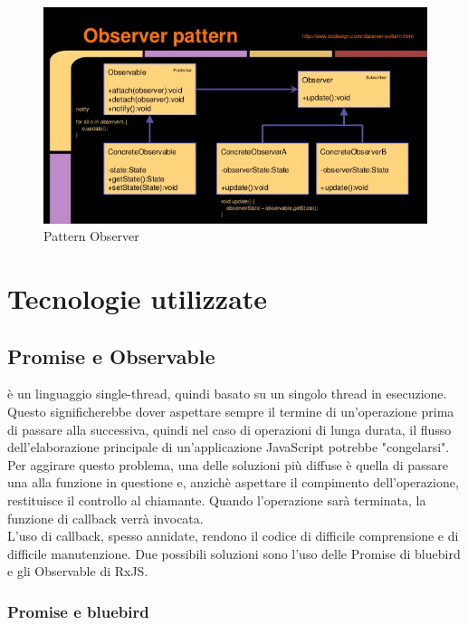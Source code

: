 	\begin{figure}[h]
		\centering
		\includegraphics[width=\textwidth,height=\textheight,keepaspectratio,scale=0.1]{images/observerpattern.png}
		\caption{Pattern Observer}\label{fig:obs1}
	\end{figure}
	\newpage
	\section{Tecnologie utilizzate}
	\subsection{Promise e Observable}


 è un linguaggio single-thread, quindi basato su un singolo thread in esecuzione. Questo significherebbe dover aspettare sempre il termine di un'operazione prima di passare alla
successiva, quindi nel caso di operazioni di lunga durata, il flusso dell'elaborazione principale di un’applicazione JavaScript potrebbe "congelarsi". \\
Per aggirare questo problema, una delle soluzioni più diffuse è quella di passare una  alla funzione in questione e, anzichè aspettare il compimento dell'operazione, restituisce
il controllo al chiamante. Quando l'operazione sarà terminata, la funzione di callback verrà invocata. \\


L'uso di callback, spesso annidate, rendono il codice di difficile comprensione e di difficile manutenzione. Due possibili soluzioni sono l'uso delle Promise di bluebird e gli Observable
di RxJS.


\subsubsection{Promise e bluebird}

